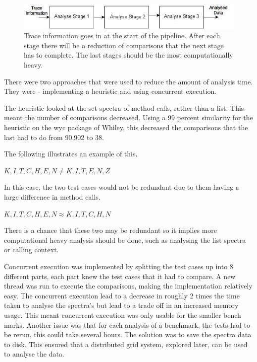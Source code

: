 \begin{figure}[h]
\includegraphics[width=\textwidth]{Pipeline.jpg}
\caption{Trace information goes in at the start of the pipeline. After each stage there will be a reduction of comparisons that the next stage has to complete. The last stages should be the most computationally heavy.}
\label{fig:pipeline}
\end{figure}

There were two approaches that were used to reduce the amount of analysis time. They were - implementing a heuristic and using concurrent execution. 

The heuristic looked at the set spectra of method calls, rather than a list. This meant the number of comparisons decreased. Using a 99 percent similarity for the heuristic on the wyc package of Whiley, this decreased the comparisons that the last had to do from 90,902 to 38.

The following illustrates an example of this.

$K,I,T,C,H,E,N \neq K,I,T,E,N,Z $

In this case, the two test cases would not be redundant due to them having a large difference in method calls.

$K,I,T,C,H,E,N \approx K,I,T,C,H,N$

There is a chance that these two may be redundant so it implies more computational heavy analysis should be done, such as analysing the list spectra or calling context. 

Concurrent execution was implemented by splitting the test cases up into 8 different parts, each part knew the test cases that it had to compare. A new thread was run to execute the comparisons, making the implementation relatively easy. The concurrent execution lead to a decrease in roughly 2 times the time taken to analyse the spectra's but lead to a trade off in an increased memory usage. This meant concurrent execution was only usable for the smaller bench marks.
Another issue was that for each analysis of a benchmark, the tests had to be rerun, this could take several hours. The solution was to save the spectra data to disk. This ensured that a distributed grid system, explored later, can be used to analyse the data.

